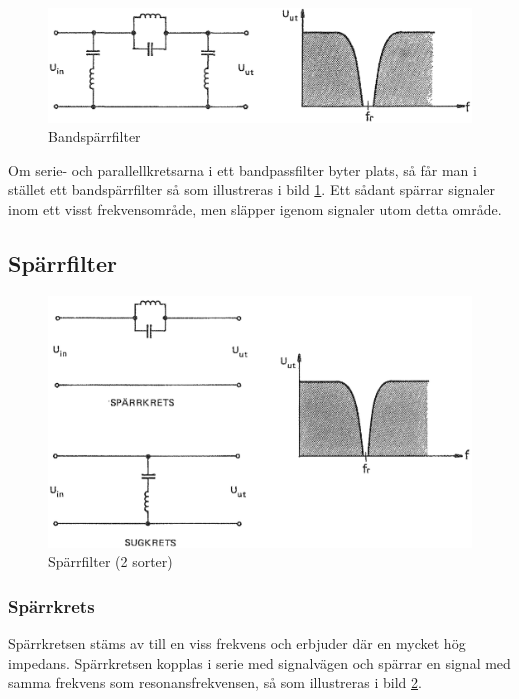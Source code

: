 \begin{figure}
\includegraphics[width=\textwidth]{images/cropped_pdfs/bild_2_3-26.pdf}
\caption{Bandspärrfilter}
\label{fig:BildII3-26}
\end{figure}

Om serie- och parallellkretsarna i ett bandpassfilter byter plats, så får man
i stället ett bandspärrfilter så som illustreras i bild \ref{fig:BildII3-26}.
Ett sådant spärrar signaler inom ett visst frekvensområde, men släpper igenom
signaler utom detta område.

\subsection{Spärrfilter}

\begin{figure}
\includegraphics[width=\textwidth]{images/cropped_pdfs/bild_2_3-27.pdf}
\caption{Spärrfilter (2 sorter)}
\label{fig:BildII3-27}
\end{figure}

\subsubsection{Spärrkrets}
Spärrkretsen stäms av till en viss frekvens och erbjuder där en mycket hög
impedans.
Spärrkretsen kopplas i serie med signalvägen och spärrar en signal med samma
frekvens som resonansfrekvensen, så som illustreras i bild \ref{fig:BildII3-27}.

